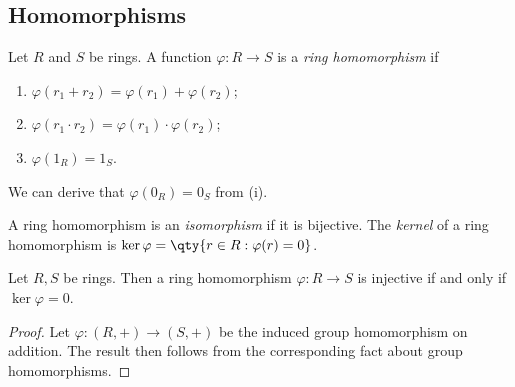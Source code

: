 \subsection{Homomorphisms}
\begin{definition}
	Let $R$ and $S$ be rings.
	A function $\varphi \colon R \to S$ is a \textit{ring homomorphism} if
	\begin{enumerate}
		\item $\varphi(r_1 + r_2) = \varphi(r_1) + \varphi(r_2)$;
		\item $\varphi(r_1 \cdot r_2) = \varphi(r_1) \cdot \varphi(r_2)$;
		\item $\varphi(1_R) = 1_S$.
	\end{enumerate}
	We can derive that $\varphi(0_R) = 0_S$ from (i).

	A ring homomorphism is an \textit{isomorphism} if it is bijective.
	The \textit{kernel} of a ring homomorphism is $\ker \varphi = \qty{r \in R : \varphi(r) = 0}$.
\end{definition}
\begin{lemma}
	Let $R, S$ be rings.
	Then a ring homomorphism $\varphi \colon R \to S$ is injective if and only if $\ker \varphi = \qty{0}$.
\end{lemma}
\begin{proof}
	Let $\varphi \colon (R, +) \to (S, +)$ be the induced group homomorphism on addition.
	The result then follows from the corresponding fact about group homomorphisms.
\end{proof}

